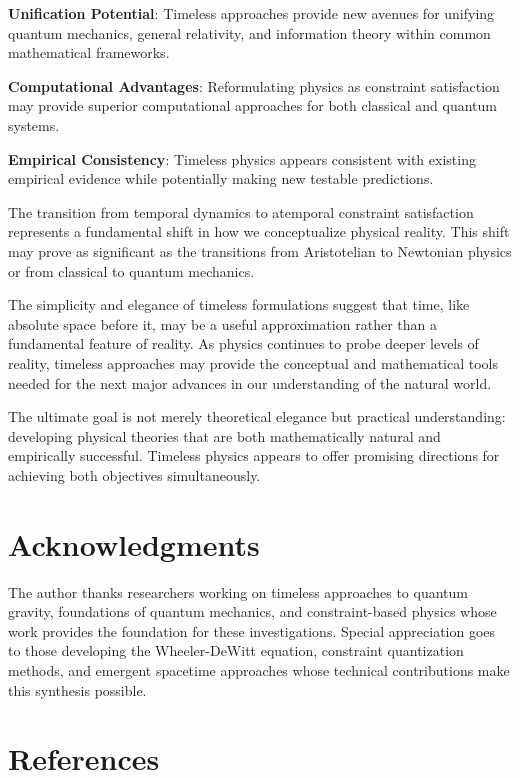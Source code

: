 \documentclass[12pt]{article}
\begin{document}
\textbf{Unification Potential}: Timeless approaches provide new avenues for unifying quantum mechanics, general relativity, and information theory within common mathematical frameworks.

\textbf{Computational Advantages}: Reformulating physics as constraint satisfaction may provide superior computational approaches for both classical and quantum systems.

\textbf{Empirical Consistency}: Timeless physics appears consistent with existing empirical evidence while potentially making new testable predictions.

The transition from temporal dynamics to atemporal constraint satisfaction represents a fundamental shift in how we conceptualize physical reality. This shift may prove as significant as the transitions from Aristotelian to Newtonian physics or from classical to quantum mechanics.

The simplicity and elegance of timeless formulations suggest that time, like absolute space before it, may be a useful approximation rather than a fundamental feature of reality. As physics continues to probe deeper levels of reality, timeless approaches may provide the conceptual and mathematical tools needed for the next major advances in our understanding of the natural world.

The ultimate goal is not merely theoretical elegance but practical understanding: developing physical theories that are both mathematically natural and empirically successful. Timeless physics appears to offer promising directions for achieving both objectives simultaneously.

\section*{Acknowledgments}

The author thanks researchers working on timeless approaches to quantum gravity, foundations of quantum mechanics, and constraint-based physics whose work provides the foundation for these investigations. Special appreciation goes to those developing the Wheeler-DeWitt equation, constraint quantization methods, and emergent spacetime approaches whose technical contributions make this synthesis possible.

\section*{References}
\end{document}
